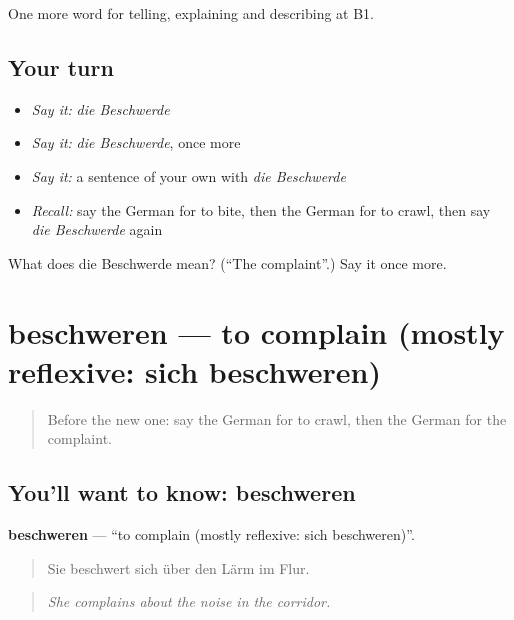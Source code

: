 \begin{grammarlens}[title={What you've built}]
One more word for telling, explaining and describing at B1.
\end{grammarlens}

\subsection*{Your turn}
\begin{itemize}
\raggedright
  \item \emph{Say it:} \emph{die Beschwerde}
  \item \emph{Say it:} \emph{die Beschwerde}, once more
  \item \emph{Say it:} a sentence of your own with \emph{die Beschwerde}
  \item \emph{Recall:} say the German for to bite, then the German for to crawl, then say \emph{die Beschwerde} again
\end{itemize}

\begin{tcolorbox}[breakable,colback=teal!4,colframe=teal!35!black,title={Before you move on}]
What does die Beschwerde mean? (\textquotedblleft{}The complaint\textquotedblright{}.) Say it once more.
\end{tcolorbox}
\section[beschweren]{beschweren — to complain (mostly reflexive: sich beschweren)}

\label{lesson:GE-C431-beschweren}



\begin{quote}
Before the new one: say the German for to crawl, then the German for the complaint.
\end{quote}

\subsection*{You'll want to know: beschweren}
\textbf{beschweren} — \textquotedblleft{}to complain (mostly reflexive: sich beschweren)\textquotedblright{}.

\begin{quote}
Sie beschwert sich über den Lärm im Flur.
\end{quote}

\begin{quote}
\emph{She complains about the noise in the corridor.}
\end{quote}

